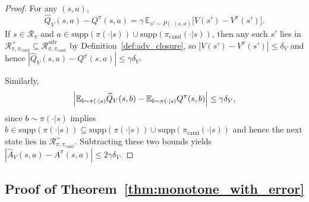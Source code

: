\documentclass{article}
\theoremstyle{plain}
\theoremstyle{definition}
\theoremstyle{remark}
\newcommand{\E}{\mathbb{E}}
\begin{document}
\begin{proof}
For any $(s,a)$,
\[
\widehat Q_V(s,a) - Q^\pi(s,a)
=
\gamma\,\E_{s'\sim P(\cdot\mid s,a)}\bigl[V(s')-V^\pi(s')\bigr].
\]
If $s\in\mathcal{R}_\pi$ and $a\in \mathrm{supp}(\pi(\cdot|s))\cup\mathrm{supp}(\pi_{\mathrm{cand}}(\cdot|s))$, then any such $s'$ lies in $\mathcal{R}_{\pi,\pi_{\mathrm{cand}}}^{+}\subseteq \mathcal{R}_{\pi,\pi_{\mathrm{cand}}}^{\mathrm{adv}}$ by Definition~\ref{def:adv_closure},
so $|V(s')-V^\pi(s')|\le \delta_V$ and hence
$|\widehat Q_V(s,a)-Q^\pi(s,a)|\le \gamma\delta_V$.

Similarly,
\[
\Bigl|\E_{b\sim\pi(\cdot\mid s)}\widehat Q_V(s,b)-\E_{b\sim\pi(\cdot\mid s)}Q^\pi(s,b)\Bigr|
\le \gamma\delta_V,
\]
since $b\sim\pi(\cdot|s)$ implies $b\in \mathrm{supp}(\pi(\cdot|s))\subseteq \mathrm{supp}(\pi(\cdot|s))\cup\mathrm{supp}(\pi_{\mathrm{cand}}(\cdot|s))$ and hence the next state lies in $\mathcal{R}_{\pi,\pi_{\mathrm{cand}}}^{+}$.
Subtracting these two bounds yields
$|\widehat A_V(s,a)-A^\pi(s,a)|\le 2\gamma\delta_V$.
\end{proof}

\subsection{Proof of Theorem~\ref{thm:monotone_with_error}}
\end{document}
